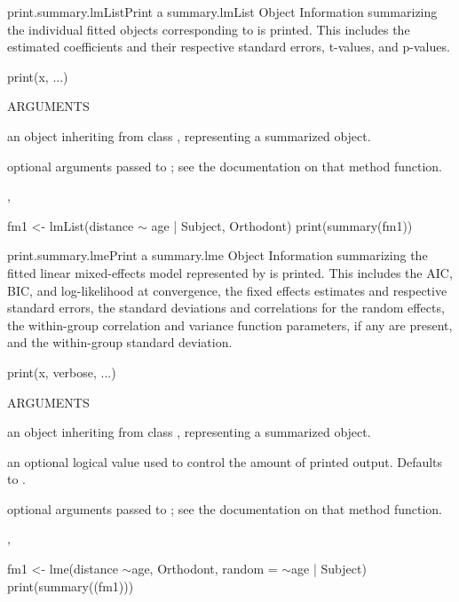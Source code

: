 \documentclass[pdftex]{article} \usepackage{url,graphicx}
\renewcommand{\Twiddle}{\mbox{\(\sim\)}}
\begin{document}
\begin{Helpfile}{print.summary.lmList}{Print a summary.lmList Object}
Information summarizing the individual  fitted objects
corresponding to  is printed. This includes the estimated
coefficients and their respective standard errors, t-values, and
p-values.
\begin{Example}
print(x, ...)
\end{Example}
\begin{Argument}{ARGUMENTS}
\item[\Co{x:}]
an object inheriting from class ,
representing a summarized  object.
\item[\Co{...:}]
optional arguments passed to ; see
the documentation on that method function.
\end{Argument}
, 
\need 15pt
\vspace{-16pt}
\begin{Example}
fm1 <- lmList(distance {\Twiddle} age | Subject, Orthodont)
print(summary(fm1))
\end{Example}
\end{Helpfile}
\begin{Helpfile}{print.summary.lme}{Print a summary.lme Object}
Information summarizing the fitted linear mixed-effects model
represented by  is printed. This includes the AIC, BIC, and
log-likelihood at convergence, the fixed effects estimates and
respective standard errors, the standard deviations and correlations
for the random effects, the within-group correlation and variance
function parameters, if any are present, and the within-group standard
deviation.
\begin{Example}
print(x, verbose, ...)
\end{Example}
\begin{Argument}{ARGUMENTS}
\item[\Co{x:}]
an object inheriting from class ,
representing a summarized  object.
\item[\Co{verbose:}]
an optional logical value used to control the amount of
printed output. Defaults to .
\item[\Co{...:}]
optional arguments passed to ; see
the documentation on that method function.
\end{Argument}
, 
\need 15pt
\vspace{-16pt} 
\begin{Example}
fm1 <- lme(distance \Twiddle age, Orthodont, random = \Twiddle age | Subject)
print(summary((fm1)))
\end{Example}
\end{Helpfile}
\end{document}
